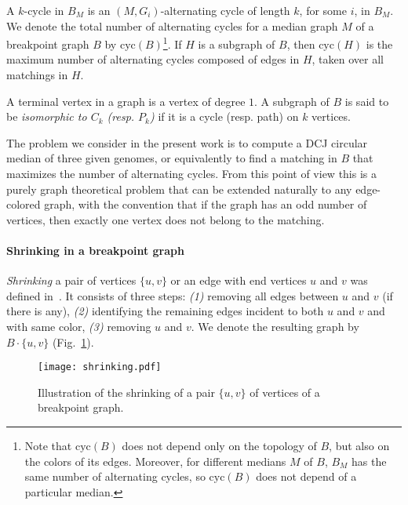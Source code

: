 \documentclass[10pt]{llncs}
\begin{document}
A $k$-cycle in $B_M$ is an $(M,G_i)$-alternating cycle of length $k$,
for some $i$, in $B_M$. We denote the total number of alternating
cycles for a median graph $M$ of a breakpoint graph $B$ by
$\text{cyc}(B)$\footnote{Note that $\text{cyc}(B)$ does not depend
  only on the topology of $B$, but also on the colors of its
  edges. Moreover, for different medians $M$ of $B$, $B_M$ has the
  same number of alternating cycles, so $\text{cyc}(B)$ does not
  depend of a particular median.}.  If $H$ is a subgraph of $B$, then
$\text{cyc}(H)$ is the maximum number of alternating cycles composed
of edges in $H$, taken over all matchings in $H$.

A terminal vertex in a graph is a vertex of degree $1$. A subgraph of
$B$ is said to be {\em isomorphic to $C_k$ (resp. $P_k$)} if it is a
cycle (resp. path) on $k$ vertices.

\begin{remark}
The problem we consider in the present work is to compute a DCJ
circular median of three given genomes, or equivalently to find a
matching in $B$ that maximizes the number of alternating cycles. From
this point of view this is a purely graph theoretical problem that can
be extended naturally to any edge-colored graph, with the convention
that if the graph has an odd number of vertices, then exactly one
vertex does not belong to the matching.
\end{remark}

\paragraph{Shrinking in a breakpoint graph}
{\em Shrinking} a pair of vertices $\{u, v\}$ or an edge with end
vertices $u$ and $v$ was defined in~\cite{Xu2008}. It consists of
three steps: {\em (1)} removing all edges between $u$ and $v$ (if
there is any), {\em (2)} identifying the remaining edges incident to
both $u$ and $v$ and with same color, {\em (3)} removing $u$ and
$v$. We denote the resulting graph by $B\cdot\{u,v\}$
(Fig.~\ref{shrink}).

\begin{figure}{
    \begin{center}
      \texttt{[image: shrinking.pdf]}
      \caption{Illustration of the shrinking of a pair $\{u, v\}$ of
        vertices of a breakpoint graph.}
      \label{shrink}
    \end{center}
}\end{figure}
\end{document}
